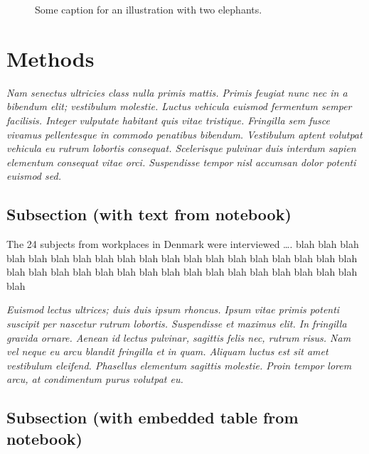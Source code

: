 \documentclass[
  a4paper,
]{scrbook}
\begin{document}
\begin{figure}
\begin{minipage}{0.50\linewidth}
{}


\end{minipage}%

\caption{\label{fig-twoelephants}Some caption for an illustration with
two elephants.}

\end{figure}%

\chapter{Methods}\label{methods}

\emph{Nam senectus ultricies class nulla primis mattis. Primis feugiat
nunc nec in a bibendum elit; vestibulum molestie. Luctus vehicula
euismod fermentum semper facilisis. Integer vulputate habitant quis
vitae tristique. Fringilla sem fusce vivamus pellentesque in commodo
penatibus bibendum. Vestibulum aptent volutpat vehicula eu rutrum
lobortis consequat. Scelerisque pulvinar duis interdum sapien elementum
consequat vitae orci. Suspendisse tempor nisl accumsan dolor potenti
euismod sed.}

\section{Subsection (with text from
notebook)}\label{subsection-with-text-from-notebook}

\label{doc-sampling}
The 24 subjects from workplaces in Denmark were interviewed \ldots. blah
blah blah blah blah blah blah blah blah blah blah blah blah blah blah
blah blah blah blah blah blah blah blah blah blah blah blah blah blah
blah blah blah blah blah blah blah

\emph{Euismod lectus ultrices; duis duis ipsum rhoncus. Ipsum vitae
primis potenti suscipit per nascetur rutrum lobortis. Suspendisse et
maximus elit. In fringilla gravida ornare. Aenean id lectus pulvinar,
sagittis felis nec, rutrum risus. Nam vel neque eu arcu blandit
fringilla et in quam. Aliquam luctus est sit amet vestibulum eleifend.
Phasellus elementum sagittis molestie. Proin tempor lorem arcu, at
condimentum purus volutpat eu.}

\section{Subsection (with embedded table from
notebook)}\label{subsection-with-embedded-table-from-notebook}
\end{document}
